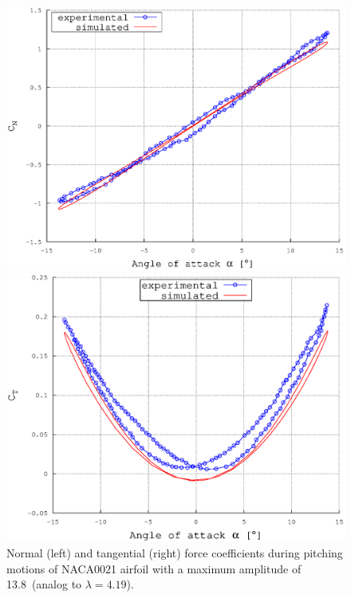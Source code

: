 \documentclass[a4paper]{jpconf}
\begin{document}
\begin{figure}[h]
\begin{minipage}{18pc}
\includegraphics[width=\columnwidth]{CN138.eps}
\end{minipage}\hspace{2pc}%
\begin{minipage}{18pc}
\includegraphics[width=\columnwidth]{CT138.eps}
\end{minipage} 
\caption{\label{fig138}Normal (left) and tangential (right) force coefficients during pitching motions of NACA0021 airfoil with a maximum amplitude of 13.8\degree\ (analog to $\lambda = 4.19$).}
\end{figure}
\end{document}

